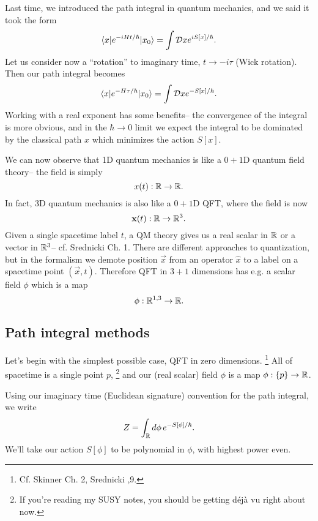 Last time, we introduced the path integral in quantum mechanics, and we said it took the form
\begin{equation}
    \langle x\rvert e^{-iHt/\hbar}\lvert x_0\rangle=\int \mathcal{D} x e^{iS[x]/\hbar}.
\end{equation}
Let us consider now a ``rotation'' to imaginary time, $t\to - i\tau$ (Wick rotation). Then our path integral becomes
\begin{equation}
    \langle x\rvert e^{-H\tau/\hbar}\lvert x_0\rangle=\int \mathcal{D} x e^{-S[x]/\hbar}.
\end{equation}
Working with a real exponent has some benefits-- the convergence of the integral is more obvious, and in the $\hbar \to 0$ limit we expect the integral to be dominated by the classical path $x$ which minimizes the action $S[x].$

We can now observe that 1D quantum mechanics is like a $0+1$D quantum field theory-- the field is simply
\begin{equation*}
    x(t): \mathbb{R} \to \mathbb{R}.
\end{equation*}
In fact, 3D quantum mechanics is also like a $0+1$D QFT, where the field is now
\begin{equation*}
    \boldsymbol{\mathbf{x}}(t): \mathbb{R} \to \mathbb{R}^3.
\end{equation*}
Given a single spacetime label $t$, a QM theory gives us a real scalar in $\mathbb{R}$ or a vector in $\mathbb{R}^3$-- cf. Srednicki Ch. 1. There are different approaches to quantization, but in the  formalism we demote position $\vec x$ from an operator $\hat x$ to a label on a spacetime point $(\vec x,t)$. Therefore QFT in $3+1$ dimensions has e.g. a scalar field $\phi$ which is a map
\begin{equation*}
    \phi: \mathbb{R}^{1,3}\to \mathbb{R}.
\end{equation*}

\subsection*{Path integral methods}
Let's begin with the simplest possible case, QFT in zero dimensions.%
    \footnote{Cf. Skinner Ch. 2, Srednicki ,9.}
All of spacetime is a single point $p$,%
    \footnote{If you're reading my SUSY notes, you should be getting d\'ej\`a vu right about now.}
and our (real scalar) field $\phi$ is a map $\phi:\{p\}\to\mathbb{R}$.

Using our imaginary time (Euclidean signature) convention for the path integral, we write
\begin{equation}
    Z = \int_{\mathbb{R}} d\phi\, e^{-S[\phi]/\hbar}.
\end{equation}
We'll take our action $S[\phi]$ to be polynomial in $\phi$, with highest power even.

